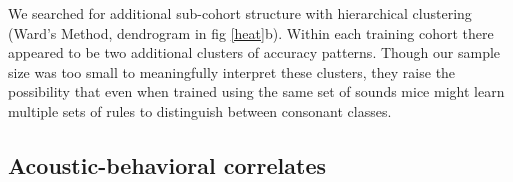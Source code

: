 We searched for additional sub-cohort structure with hierarchical clustering (Ward's Method, dendrogram in fig \ref{heat}b). Within each training cohort there appeared to be two additional clusters of accuracy patterns. Though our sample size was too small to meaningfully interpret these clusters, they raise the possibility that even when trained using the same set of sounds mice might learn multiple sets of rules to distinguish between consonant classes.


%
%
%
\subsection{Acoustic-behavioral correlates}



